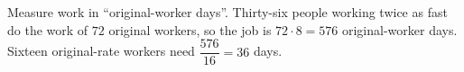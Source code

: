Measure work in ``original-worker days''. Thirty-six people working twice as fast do the work of $72$ original workers, so the job is $72\cdot8=576$ original-worker days. Sixteen original-rate workers need $\dfrac{576}{16}=\boxed{36}$ days.
